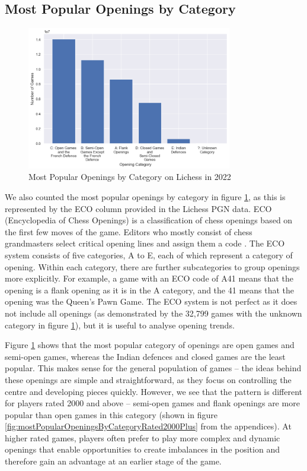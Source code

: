\documentclass[a4paper, 11pt]{article}
\begin{document}
\subsection{Most Popular Openings by Category}
\begin{figure}[H]
    \centering
    \caption{Most Popular Openings by Category on Lichess in 2022}
    \label{fig:mostPopularOpeningsByCategory}
    \includegraphics[width=0.8\textwidth]{Most Popular Openings by Category.png}
\end{figure}

We also counted the most popular openings by category in figure \ref{fig:mostPopularOpeningsByCategory}, as this is represented by the ECO column provided in the Lichess PGN data. ECO (Encyclopedia of Chess Openings) is a classification of chess openings based on the first few moves of the game. Editors who mostly consist of chess grandmasters select critical opening lines and assign them a code \cite{matanovic1971classification}. The ECO system consists of five categories, A to E, each of which represent a category of opening. Within each category, there are further subcategories to group openings more explicitly. For example, a game with an ECO code of A41 means that the opening is a flank opening as it is in the A category, and the 41 means that the opening was the Queen's Pawn Game. The ECO system is not perfect as it does not include all openings (as demonstrated by the 32,799 games with the unknown category in figure \ref{fig:mostPopularOpeningsByCategory}), but it is useful to analyse opening trends.

Figure \ref{fig:mostPopularOpeningsByCategory} shows that the most popular category of openings are open games and semi-open games, whereas the Indian defences and closed games are the least popular. This makes sense for the general population of games -- the ideas behind these openings are simple and straightforward, as they focus on controlling the centre and developing pieces quickly. However, we see that the pattern is different for players rated 2000 and above -- semi-open games and flank openings are more popular than open games in this category (shown in figure \ref{fig:mostPopularOpeningsByCategoryRated2000Plus} from the appendices). At higher rated games, players often prefer to play more complex and dynamic openings that enable opportunities to create imbalances in the position and therefore gain an advantage at an earlier stage of the game.
\end{document}
